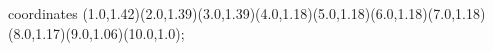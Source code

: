 					coordinates { (1.0,1.42)(2.0,1.39)(3.0,1.39)(4.0,1.18)(5.0,1.18)(6.0,1.18)(7.0,1.18)(8.0,1.17)(9.0,1.06)(10.0,1.0)};